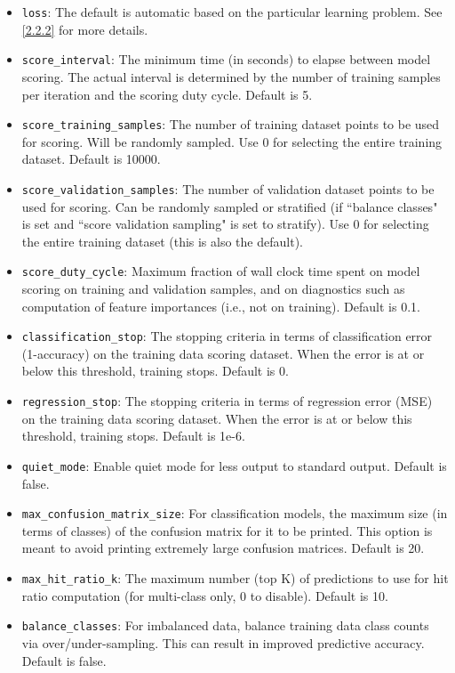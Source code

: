 \documentclass[11pt]{article}
\begin{document}
\begin{itemize}
\item \texttt{loss}: The default is automatic based on the particular learning problem. See \ref{2.2.2} for more details.
\item \texttt{score\_interval}: The minimum time (in seconds) to elapse between model scoring. The actual interval is determined by the number of training samples per iteration and the scoring duty cycle. Default is 5.
\item \texttt{score\_training\_samples}: The number of training dataset points to be used for scoring. Will be randomly sampled. Use 0 for selecting the entire training dataset. Default is 10000.
\item \texttt{score\_validation\_samples}: The number of validation dataset points to be used for scoring. Can be randomly sampled or stratified (if ``balance classes" is set and ``score validation sampling" is set to stratify). Use 0 for selecting the entire training dataset (this is also the default).
\item \texttt{score\_duty\_cycle}: Maximum fraction of wall clock time spent on model scoring on training and validation samples, and on diagnostics such as computation of feature importances (i.e., not on training). Default is 0.1.
\item \texttt{classification\_stop}: The stopping criteria in terms of classification error (1-accuracy) on the training data scoring dataset. When the error is at or below this threshold, training stops. Default is 0.
\item \texttt{regression\_stop}: The stopping criteria in terms of regression error (MSE) on the training data scoring dataset. When the error is at or below this threshold, training stops. Default is 1e-6.
\item \texttt{quiet\_mode}: Enable quiet mode for less output to standard output. Default is false.
\item \texttt{max\_confusion\_matrix\_size}: For classification models, the maximum size (in terms of classes) of the confusion matrix for it to be printed. This option is meant to avoid printing extremely large confusion matrices. Default is 20.
\item \texttt{max\_hit\_ratio\_k}: The maximum number (top K) of predictions to use for hit ratio computation (for multi-class only, 0 to disable). Default is 10.
\item \texttt{balance\_classes}: For imbalanced data, balance training data class counts via over/under-sampling. This can result in improved predictive accuracy. Default is false.

\end{itemize}
\end{document}
